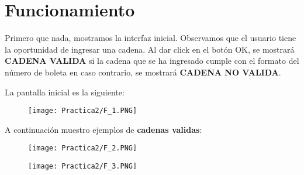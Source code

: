 \documentclass[12pt]{article}
\begin{document}

	\section{Funcionamiento}
	Primero que nada, mostramos la interfaz inicial. Observamos que el 
	usuario tiene la oportunidad de ingresar una cadena. Al dar click en el botón OK, se mostrará
	\textbf{CADENA VALIDA} si la cadena que se ha ingresado cumple con el formato del número de boleta
	en caso contrario, se mostrará \textbf{CADENA NO VALIDA}.

	La pantalla inicial es la siguiente:
	
	\begin{figure}[H]
	        \centering
	        \texttt{[image: Practica2/F\_1.PNG]}
	\end{figure}
	
	A continuación muestro ejemplos de \textbf{cadenas validas}:
	\begin{figure}[H]
	        \centering
	        \texttt{[image: Practica2/F\_2.PNG]}
	\end{figure}
	
	\begin{figure}[H]
	        \centering
	        \texttt{[image: Practica2/F\_3.PNG]}
	\end{figure}
\end{document}
